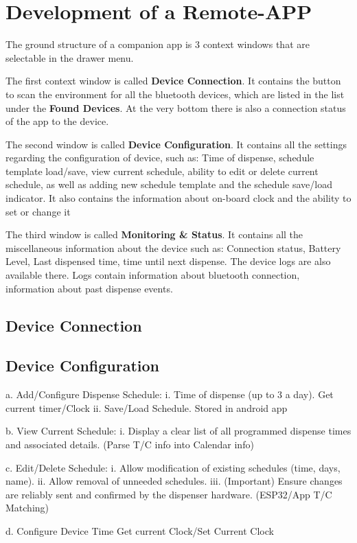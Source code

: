 \section{Development of a Remote-APP}
The ground structure of a companion app is 3 context windows that are selectable in the drawer menu. 

The first context window is called \textbf{Device Connection}. It contains the button to scan the environment for all the bluetooth devices, which are listed in the list under the \textbf{Found Devices}. At the very bottom there is also a connection status of the app to the device.

The second window is called \textbf{Device Configuration}. It contains all the settings regarding the configuration of device, such as: Time of dispense, schedule template load/save, view current schedule, ability to edit or delete current schedule, as well as adding new schedule template and the schedule save/load indicator. It also contains the information about on-board clock and the ability to set or change it


The third window is called \textbf{Monitoring \& Status}. It contains all the miscellaneous information about the device such as: Connection status, Battery Level, Last dispensed time, time until next dispense. The device logs are also available there. Logs contain information about bluetooth connection, information about past dispense events.

\subsection{Device Connection}
\subsection{Device Configuration}
  a. Add/Configure Dispense Schedule:
  i. Time of dispense (up to 3 a day). Get current timer/Clock
  ii. Save/Load Schedule. Stored in android app
  
  b. View Current Schedule:
  i. Display a clear list of all programmed dispense times and associated details. (Parse T/C info into Calendar info)
  
  c. Edit/Delete Schedule:
  i. Allow modification of existing schedules (time, days, name).
  ii. Allow removal of unneeded schedules.
  iii. (Important) Ensure changes are reliably sent and confirmed by the dispenser hardware. (ESP32/App T/C Matching)
  
  d. Configure Device Time Get current Clock/Set Current Clock
  
